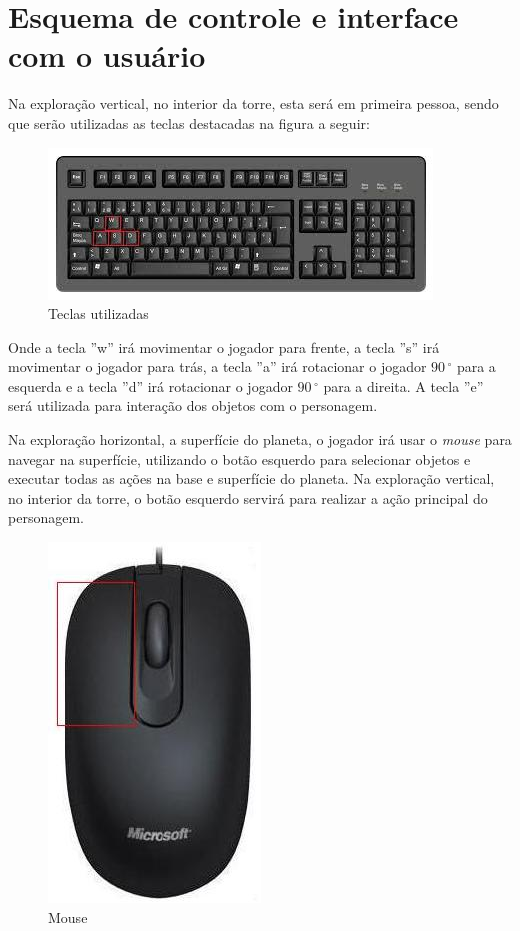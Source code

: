 \documentclass[11pt]{article} %
\begin{document}
\section{Esquema de controle e interface com o usuário}

Na exploração vertical, no interior da torre, esta será em primeira pessoa, sendo que serão utilizadas as teclas destacadas na figura a seguir:\\

\begin{figure}[!htp]
\centering
\includegraphics[scale=0.75]{res/keyboard.jpg}
\caption{Teclas utilizadas}
\label{Teclado}
\end{figure}

Onde a tecla ''w'' irá movimentar o jogador para frente, a tecla ''s'' irá movimentar o jogador para trás, a tecla ''a'' irá rotacionar o jogador $90\,^{\circ}$ para a esquerda e a tecla ''d'' irá rotacionar o jogador $90\,^{\circ}$ para a direita. A tecla ''e'' será utilizada para interação dos objetos com o personagem.

Na exploração horizontal, a superfície do planeta, o jogador irá usar o \textit{mouse} para navegar na superfície, utilizando o botão esquerdo para selecionar objetos e executar todas as ações na base e superfície do planeta. Na exploração vertical, no interior da torre, o botão esquerdo servirá para realizar a ação principal do personagem.

\begin{figure}[!htp]
\centering
\includegraphics[scale=0.4]{res/mouse.jpg}
\caption{Mouse}
\label{Mouse}
\end{figure}
\end{document}
